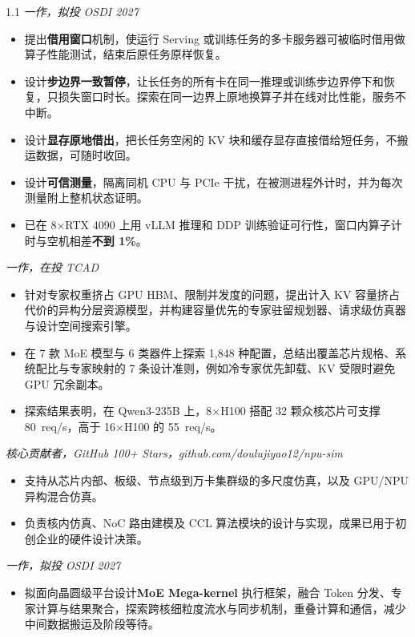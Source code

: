 \documentclass{resume}
\begin{document}
\begin{spacing}{1.1}
		\textit{一作，拟投 OSDI 2027}
		\begin{itemize}
			\item 提出\textbf{借用窗口}机制，使运行 Serving 或训练任务的多卡服务器可被临时借用做算子性能测试，结束后原任务原样恢复。
			\item 设计\textbf{步边界一致暂停}，让长任务的所有卡在同一推理或训练步边界停下和恢复，只损失窗口时长。探索在同一边界上原地换算子并在线对比性能，服务不中断。
			\item 设计\textbf{显存原地借出}，把长任务空闲的 KV 块和缓存显存直接借给短任务，不搬运数据，可随时收回。
			\item 设计\textbf{可信测量}，隔离同机 CPU 与 PCIe 干扰，在被测进程外计时，并为每次测量附上整机状态证明。
			\item 已在 8×RTX 4090 上用 vLLM 推理和 DDP 训练验证可行性，窗口内算子计时与空机相差\textbf{不到 1\%}。
		\end{itemize}

		\textit{一作，在投 TCAD}
		\begin{itemize}
			\item 针对专家权重挤占 GPU HBM、限制并发度的问题，提出计入 KV 容量挤占代价的异构分层资源模型，并构建容量优先的专家驻留规划器、请求级仿真器与设计空间搜索引擎。
			\item 在 7 款 MoE 模型与 6 类器件上探索 1,848 种配置，总结出覆盖芯片规格、系统配比与专家映射的 7 条设计准则，例如冷专家优先卸载、KV 受限时避免 GPU 冗余副本。
			\item 探索结果表明，在 Qwen3-235B 上，8×H100 搭配 32 颗众核芯片可支撑 80~req/s，高于 16×H100 的 55~req/s。
		\end{itemize}

		\textit{核心贡献者，GitHub 100+ Stars，github.com/doulujiyao12/npu-sim}
		\begin{itemize}
			\item 支持从芯片内部、板级、节点级到万卡集群级的多尺度仿真，以及 GPU/NPU 异构混合仿真。
			\item 负责核内仿真、NoC 路由建模及 CCL 算法模块的设计与实现，成果已用于初创企业的硬件设计决策。
		\end{itemize}

		\textit{一作，拟投 OSDI 2027}
		\begin{itemize}
			\item 拟面向晶圆级平台设计\textbf{MoE Mega-kernel} 执行框架，融合 Token 分发、专家计算与结果聚合，探索跨核细粒度流水与同步机制，重叠计算和通信，减少中间数据搬运及阶段等待。
		\end{itemize}


\end{spacing}
\end{document}
